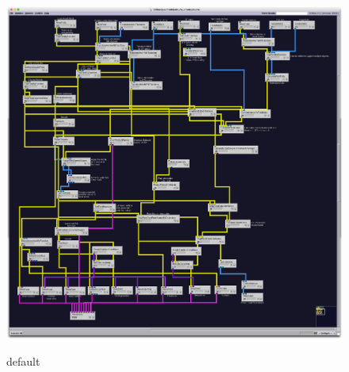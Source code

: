\begin{figure}[p]
\begin{center}
\includegraphics[width=\textwidth]{Figures/aniso_network.png}\\
\caption{default}
\label{default}
\end{center}
\end{figure}

